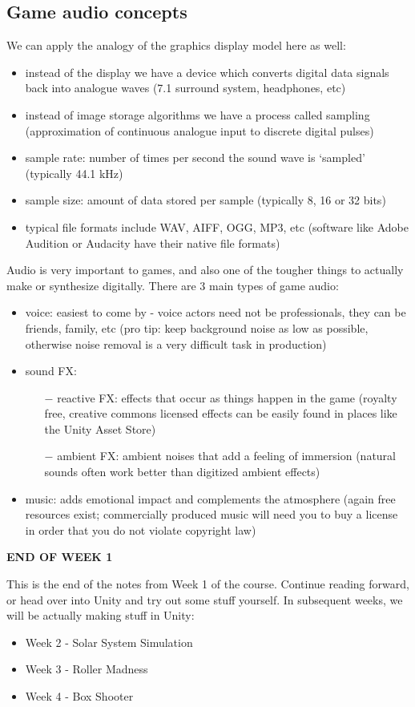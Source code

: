 \documentclass{article}[a4paper,12pt]
\theoremstyle{definition}
\begin{document}
\subsection{Game audio concepts}
We can apply the analogy of the graphics display model here as well:
\begin{itemize}
	\item instead of the display we have a device which converts digital data signals back into analogue waves (7.1 surround system, headphones, etc)
	\item instead of image storage algorithms we have a process called sampling (approximation of continuous analogue input to discrete digital pulses)
	\item sample rate: number of times per second the sound wave is `sampled' (typically 44.1 kHz)
	\item sample size: amount of data stored per sample (typically 8, 16 or 32 bits)
	\item typical file formats include WAV, AIFF, OGG, MP3, etc (software like Adobe Audition or Audacity have their native file formats)
\end{itemize}
Audio is very important to games, and also one of the tougher things to actually make or synthesize digitally. There are 3 main types of game audio:
\begin{itemize}
	\item voice: easiest to come by - voice actors need not be professionals, they can be friends, family, etc (pro tip: keep background noise as low as possible, otherwise noise removal is a very difficult task in production)
	\item sound FX:
	\begin{itemize}
		\item[$-$] reactive FX: effects that occur as things happen in the game (royalty free, creative commons licensed effects can be easily found in places like the Unity Asset Store)
		\item[$-$] ambient FX: ambient noises that add a feeling of immersion (natural sounds often work better than digitized ambient effects)
	\end{itemize}
	\item music: adds emotional impact and complements the atmosphere (again free resources exist; commercially produced music will need you to buy a license in order that you do not violate copyright law)
\end{itemize}
\hrulefill
\begin{center}\textbf{END OF WEEK 1}\end{center}
This is the end of the notes from Week 1 of the course. Continue reading forward, or head over into Unity and try out some stuff yourself. In subsequent weeks, we will be actually making stuff in Unity:
\begin{itemize}
	\item Week 2 - Solar System Simulation
	\item Week 3 - Roller Madness
	\item Week 4 - Box Shooter
\end{itemize}
\end{document}
